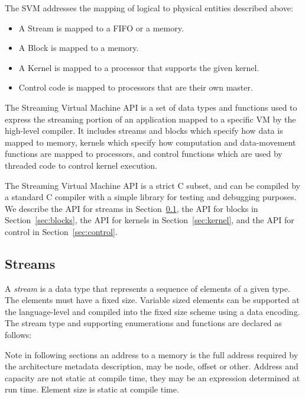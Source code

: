 
The SVM addresses the mapping of logical to physical entities
described above:

\begin{itemize}

\item A Stream is mapped to a FIFO or a memory.

\item A Block is mapped to a memory.

\item A Kernel is mapped to a processor that supports the given kernel.

\item Control code is mapped to processors that are their own master.

\end{itemize}


The Streaming Virtual Machine API is a set of data types and functions
used to express the streaming portion of an application mapped to a
specific VM by the high-level compiler. It includes streams and blocks
which specify how data is mapped to memory, kernels which specify how
computation and data-movement functions are mapped to processors, and
control functions which are used by threaded code to control kernel
execution.

The Streaming Virtual Machine API is a strict C subset, and can be
compiled by a standard C compiler with a simple library for testing
and debugging purposes.  We describe the API for streams in
Section~\ref{sec:streams}, the API for blocks in
Section~\ref{sec:blocks}, the API for kernels in
Section~\ref{sec:kernel}, and the API for control in
Section~\ref{sec:control}.

\subsection{Streams}
\label{sec:streams}

A {\it stream} is a data type that represents a sequence of elements
of a given type.  The elements must have a fixed size. Variable sized
elements can be supported at the language-level and compiled into the
fixed size scheme using a data encoding. The stream type and
supporting enumerations and functions are declared as follows:

Note in following sections an address to a memory is the full address
required by the architecture metadata description, may be node, offset
or other.  Address and capacity are not static at compile time, they
may be an expression determined at run time.  Element size is static
at compile time.


